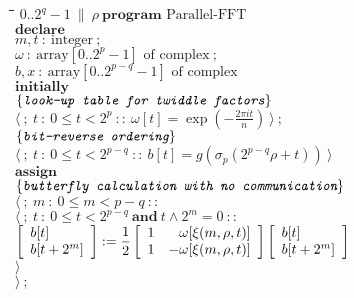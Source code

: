 \begin{tabbing}
	\quad\=\quad\=\quad\=\quad\=\kill
	$0..2^q-1\ \|\ \rho\ \mathbf{program} \textrm{ Parallel-FFT}$\\
	$\mathbf{declare}$\\
		\>$m,t\ :\ \textrm{integer}\ ;$\\
		\>$\omega\ :\ \mathrm{array}[0..2^{p}-1] \textrm{ of complex}\ ;$\\
		\>$b,x\ :\ \mathrm{array}[0..2^{p-q}-1] \textrm{ of complex}$\\
	$\mathbf{initially}$\\
		\>$\color{MidnightBlue}\curlb{\textit{\ttfamily look-up table for twiddle factors}}$\\
		\>$\langle \ ;\ t\ :\ 0\leq t<2^p\ ::\ \omega[t] = \exp(-\frac{2\pi it}{n})\ \rangle\ ;$\\
		\>$\color{MidnightBlue}\curlb{\textit{\ttfamily bit-reverse ordering}}$\\
		\>$\langle \ ;\ t\ :\ 0\leq t<2^{p-q}\ ::\ b[t] = g(\sigma_p(2^{p-q}\rho + t))\ \rangle$\\
	$\mathbf{assign}$\\
		\>$\color{MidnightBlue}\curlb{\textit{\ttfamily butterfly calculation with no communication}}$\\
		\>$\langle \ ;\ m\ :\ 0\leq m<p-q\ ::$\\
			\>\>$\langle \ ;\ t\ :\ 0\leq t<2^{p-q}\ \mathbf{and}\ t\wedge 2^m=0\ ::$\\
				\>\>\>$\boxb{ \begin{array}{l} b[t] \\ b[t+2^m] \end{array} } := \dfrac{1}{2} \boxb{ \begin{array}{lr} 1 & \omega[\xi(m,\rho, t)] \\ 1 & -\omega[\xi(m,\rho, t)] \end{array} }\boxb{ \begin{array}{l} b[t] \\ b[t+2^m] \end{array} }$\\
			\>\>$\rangle$\\
		\>$\rangle\ ;$\\
\end{tabbing}